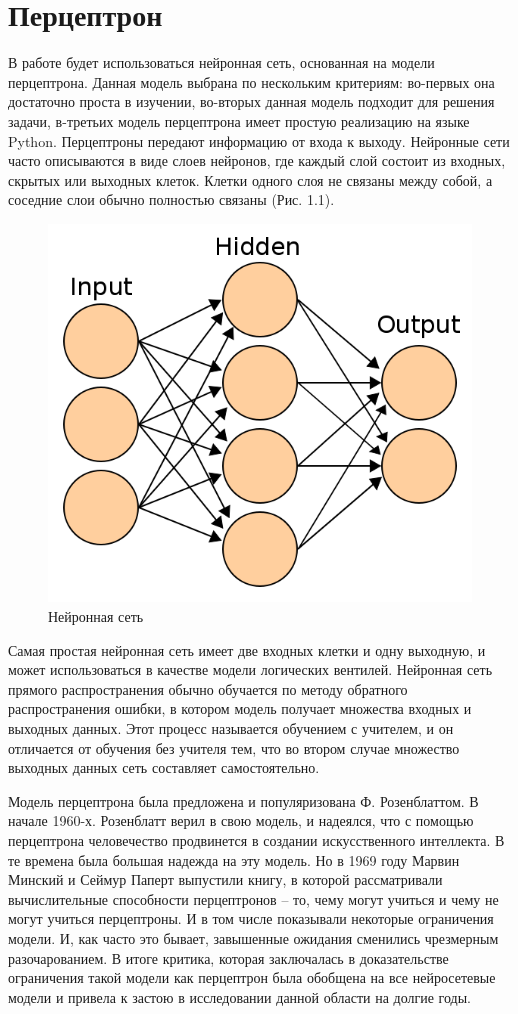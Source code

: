 \section{Перцептрон}

В работе будет использоваться нейронная сеть, основанная на модели перцептрона. Данная модель выбрана по нескольким критериям: во-первых она достаточно проста в изучении, во-вторых данная модель подходит для решения задачи, в-третьих модель перцептрона имеет простую реализацию на языке Python.  
Перцептроны передают информацию от входа к выходу. Нейронные сети часто описываются в виде слоев нейронов, где каждый слой состоит из входных, скрытых или выходных клеток. Клетки одного слоя не связаны между собой, а соседние слои обычно полностью связаны (Рис. 1.1). 

\begin{figure}[h]
  \centering
  \includegraphics[width=0.5\linewidth]{./img/neural-network}
  \caption{Нейронная сеть}
  \label{fig:mpr}
\end{figure} 

Самая простая нейронная сеть имеет две входных клетки и одну выходную, и может использоваться в качестве модели логических вентилей. Нейронная сеть прямого распространения обычно обучается по методу обратного распространения ошибки, в котором модель получает множества входных и выходных данных. Этот процесс называется обучением с учителем, и он отличается от обучения без учителя тем, что во втором случае множество выходных данных сеть составляет самостоятельно.

Модель перцептрона была предложена и популяризована Ф. Розенблаттом. В начале 1960-х. Розенблатт верил в свою модель, и надеялся, что с помощью перцептрона человечество продвинется в создании искусственного интеллекта. В те времена была большая надежда на эту модель. Но в 1969 году Марвин Минский и Сеймур Паперт выпустили книгу, в которой рассматривали вычислительные способности перцептронов – то, чему могут учиться и чему не могут учиться перцептроны. И в том числе показывали некоторые ограничения модели. И, как часто это бывает, завышенные ожидания сменились чрезмерным разочарованием. В итоге критика, которая заключалась в доказательстве ограничения такой модели как перцептрон была обобщена на все нейросетевые модели и привела к застою в исследовании данной области на долгие годы.


